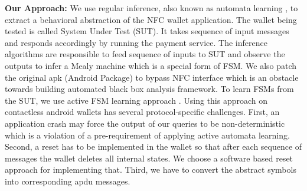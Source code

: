 \textbf{Our Approach: } We use regular inference, also known as automata learning \cite{ANGLUIN198787}, to extract a behavioral 
abstraction of the NFC wallet application. The wallet being tested is called System Under Test (SUT). It takes sequence of 
input messages and responds accordingly by running the payment service. The inference algorithms \cite{Niese2003AnIA} are responsible 
to feed sequence of inputs to SUT and observe the outputs to infer a Mealy machine which is a special form of FSM. We also patch the original 
apk (Android Package) to bypass NFC interface which is an obstacle towards building automated black box analysis 
framework. To learn FSMs from the SUT, we use active FSM learning approach \cite{dikeue} \cite{dynamictesting}. 
Using this approach on contactless android wallets has several protocol-specific challenges. First, an application crash 
may force the output of our queries to be non-deterministic which is a violation of a pre-requirement of applying active automata learning. 
Second, a reset has to be implemented in the wallet so that after each sequence of messages the wallet deletes all 
internal states. We choose a software based reset approach for implementing that. Third, we have to convert the 
abstract symbols into corresponding apdu messages. 